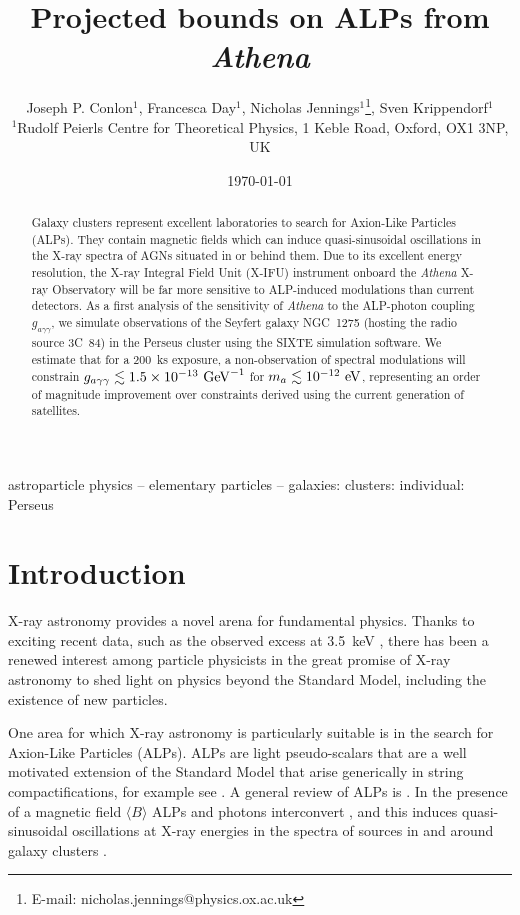 \documentclass[fleqn,usenatbib,useAMS]{mnras}
\title[Projected bounds on ALPs from ATHENA]{Projected bounds on ALPs from {\it Athena}}
\author[J. P. Conlon et al.]{
Joseph P. Conlon$^{1}$,
Francesca Day$^{1}$, 
Nicholas Jennings$^{1}$\thanks{E-mail: nicholas.jennings@physics.ox.ac.uk}, 
Sven Krippendorf$^{1}$
\newauthor{ and Francesco Muia$^{1}$}
\\
$^{1}$Rudolf Peierls Centre for Theoretical Physics, 1 Keble Road, Oxford, OX1 3NP, UK\\
}
\date{\today}
\begin{document}
\label{firstpage}
\pagerange{\pageref{firstpage}--\pageref{lastpage}}
\maketitle

\begin{abstract}
Galaxy clusters represent excellent laboratories to search for Axion-Like Particles (ALPs). They contain magnetic fields which can induce quasi-sinusoidal oscillations in the X-ray spectra of AGNs situated in or behind them. Due to its excellent 
energy resolution, the X-ray Integral Field Unit (X-IFU) instrument onboard the {\it Athena} X-ray Observatory will be far more sensitive to ALP-induced modulations than current detectors. As a first analysis of the sensitivity of {\it Athena} to the ALP-photon coupling $g_{a \gamma \gamma}$, we simulate observations of the Seyfert galaxy NGC~1275 (hosting the radio source 3C~84) in the Perseus cluster using the SIXTE simulation software. We estimate that for a 200~ks exposure, a non-observation of spectral modulations will constrain ${g_{a\gamma\gamma}\lesssim1.5\times10^{-13}~\rm{GeV}^{-1}}$ for $m_a\lesssim10^{-12}~\rm{eV}$, representing an order of magnitude improvement over constraints derived  using the current generation of satellites.
\end{abstract}

\begin{keywords}
astroparticle physics -- elementary particles -- galaxies: clusters: individual: Perseus
\end{keywords}

\section{Introduction}
\label{introduction}
X-ray astronomy provides a novel arena for fundamental physics. Thanks to exciting recent data, such as the observed excess at 3.5~keV \citep{Bulbul, Boyarsky}, there has been a renewed interest among particle physicists in the great promise of X-ray astronomy to shed light on physics beyond the Standard Model, including the existence of new particles.

One area for which X-ray astronomy is particularly suitable
 is in the search for Axion-Like Particles (ALPs).
ALPs are light pseudo-scalars that are a well motivated extension of the Standard Model \citep{PecceiQuinn,Wilczek,Weinberg} that arise
 generically in string compactifications, for example see \citep{hep-th/0602233,hep-th/0605206,1206.0819}. A general review of ALPs is \citep{RingwaldReview}. In the presence of a magnetic field $\langle B \rangle$ ALPs and photons interconvert \citep{Sikivie:1983ip, Raffelt:1987im}, and this induces quasi-sinusoidal oscillations at X-ray energies in the spectra of sources in and around galaxy clusters \citep{1304.0989, 1509.06748}.
\end{document}
